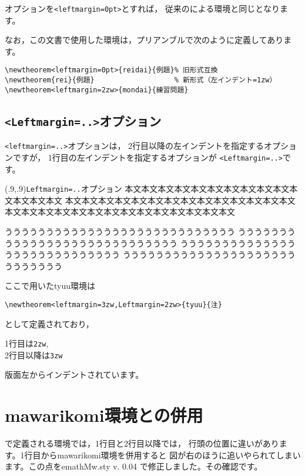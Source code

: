 \documentclass[a4j]{jarticle}
\newtheorem<leftmargin=0pt>{reidai}{例題}
\newtheorem<leftmargin=2zw>{mondai}{練習問題}
\newtheorem<leftmargin=3zw,Leftmargin=2zw>{tyuu}{注}
\begin{document}
オプションを\verb+<leftmargin=0pt>+とすれば，
従来のによる環境と同じとなります。

なお，この文書で使用した環境は，プリアンブルで次のように定義してあります。

\begin{jquote}
\begin{verbatim}
\newtheorem<leftmargin=0pt>{reidai}{例題}% 旧形式互換
\newtheorem{rei}{例題}                   % 新形式（左インデント=1zw）
\newtheorem<leftmargin=2zw>{mondai}{練習問題}
\end{verbatim}
\end{jquote}
\clearpage

\subsection{\texttt{<Leftmargin=..>}オプション}
\verb+<leftmargin=..>+オプションは，
2行目以降の左インデントを指定するオプションですが，
1行目の左インデントを指定するオプションが
\verb+<Leftmargin=..>+です。

\begin{showEx}(.9,.9){\texttt{Leftmargin=..}オプション}
本文本文本文本文本文本文本文本文本文本文本文本文本文本文
本文本文本文本文本文本文本文本文本文本文本文本文本文本文
本文本文本文本文本文本文本文本文本文本文本文本文本文本文

\begin{tyuu}
うううううううううううううううううううううううううううう
うううううううううううううううううううううううううううう
うううううううううううううううううううううううううううう
うううううううううううううううううううううううううううう
\end{tyuu}
\end{showEx}

ここで用いた\textsf{tyuu}環境は
\begin{jquote}
\begin{verbatim}
\newtheorem<leftmargin=3zw,Leftmargin=2zw>{tyuu}{注}
\end{verbatim}
\end{jquote}
として定義されており，
\begin{jquote}
  1行目は\verb+2zw+,\\
  2行目以降は\verb+3zw+
\end{jquote}
版面左からインデントされています。
\clearpage

\section{\textsf{mawarikomi}環境との併用}
で定義される環境では，1行目と2行目以降では，
行頭の位置に違いがあります。1行目から\textsf{mawarikomi}環境を併用すると
図が右のほうに追いやられてしまいます。この点を\textsf{emathMw.sty v. 0.04}
で修正しました。その確認です。
\end{document}

